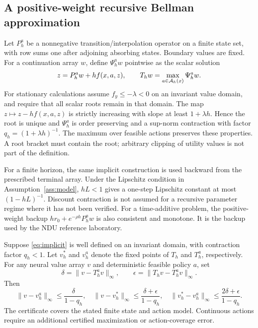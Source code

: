 \subsection{A positive-weight recursive Bellman approximation}
Let $P_h^a$ be a nonnegative transition/interpolation operator on a finite state set, with row sums one after adjoining absorbing states. Boundary values are fixed. For a continuation array $w$, define $\Psi_h^a w$ pointwise as the scalar solution
\begin{equation}\label{eq:implicit}
 z=P_h^a w+h f(x,a,z),\qquad
 T_h w=\max_{a\in\mathcal A_h(x)}\Psi_h^a w.
\end{equation}
For stationary calculations assume $f_y\leq-\lambda<0$ on an invariant value domain, and require that all scalar roots remain in that domain. The map $z\mapsto z-hf(x,a,z)$ is strictly increasing with slope at least $1+\lambda h$. Hence the root is unique and $\Psi_h^a$ is order preserving and a sup-norm contraction with factor $q_h=(1+\lambda h)^{-1}$. The maximum over feasible actions preserves these properties. A root bracket must contain the root; arbitrary clipping of utility values is not part of the definition.

For a finite horizon, the same implicit construction is used backward from the prescribed terminal array. Under the Lipschitz condition in Assumption~\ref{ass:model}, $hL<1$ gives a one-step Lipschitz constant at most $(1-hL)^{-1}$. Discount contraction is not assumed for a recursive parameter regime where it has not been verified. For a time-additive problem, the positive-weight backup $hr_0+e^{-\rho h}P_h^a w$ is also consistent and monotone. It is the backup used by the NDU reference laboratory.

\begin{theorem}\label{thm:discrete}
Suppose \eqref{eq:implicit} is well defined on an invariant domain, with contraction factor $q_h<1$. Let $v_h^*$ and $v_h^a$ denote the fixed points of $T_h$ and $T_h^a$, respectively. For any neural value array $v$ and deterministic feasible policy $a$, set
\[
 \delta=\|v-T_h^av\|_\infty,\qquad
 \epsilon=\|T_hv-T_h^av\|_\infty.
\]
Then
\begin{equation}\label{eq:discretebound}
 \|v-v_h^a\|_\infty\leq\frac\delta{1-q_h},\quad
 \|v-v_h^*\|_\infty\leq\frac{\delta+\epsilon}{1-q_h},\quad
 \|v_h^*-v_h^a\|_\infty\leq\frac{2\delta+\epsilon}{1-q_h}.
\end{equation}
The certificate covers the stated finite state and action model. Continuous actions require an additional certified maximization or action-coverage error.
\end{theorem}

